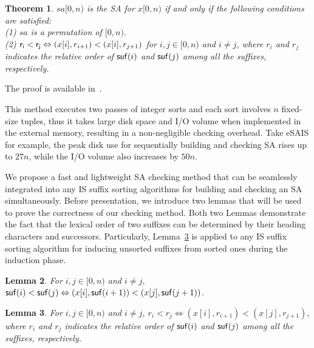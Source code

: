 \documentclass[10pt,journal,compsoc]{IEEEtran}
\newtheorem{theorem}{Theorem}[section]
\newtheorem{lemma}[theorem]{Lemma}
\begin{document}
\begin{theorem} \label{theorem:1}
	$sa[0, n)$ is the SA for $x[0, n)$ if and only if the following conditions are satisfied:\\
	(1) $sa$ is a permutation of $[0, n)$. \\	
	(2) ${\sf r_i < r_j} \Leftrightarrow (x[i], r_{i + 1}) < (x[i], r_{j + 1})$ for $ i, j \in [0, n)$ and $i\ne j$, where $r_i$ and $r_j$ indicates the relative order of ${\sf suf}(i)$ and ${\sf suf}(j)$ among all the suffixes, respectively. \\
\end{theorem}

\begin{IEEEproof}
	The proof is available in~\cite{Dementiev2008a}.
\end{IEEEproof}

This method executes two passes of integer sorts and each sort involves $n$ fixed-size tuples, thus it takes large disk space and I/O volume when implemented in the external memory, resulting in a non-negligible checking overhead. Take eSAIS for example, the peak disk use for sequentially building and checking SA rises up to $27n$, while the I/O volume also increases by $50n$. 


We propose a fast and lightweight SA checking method that can be seamlessly integrated into any IS suffix sorting algorithms for building and checking an SA simultaneously. Before presentation, we introduce two lemmas that will be used to prove the correctness of our checking method. Both two Lemmas demonstrate the fact that the lexical order of two suffixes can be determined by their heading characters and successors. Particularly, Lemma~\ref{lemma:2} is applied to any IS suffix sorting algorithm for inducing unsorted suffixes from sorted ones during the induction phase.

\begin{lemma} \label{lemma:1}
	For $i, j \in [0, n)$ and $i \ne j$, ${\sf suf}(i) < {\sf suf}(j) \Leftrightarrow (x[i], {\sf suf}(i + 1)) < (x[j], {\sf suf}(j + 1))$.
\end{lemma}

\begin{lemma} \label{lemma:2}
	For $i, j \in [0, n)$ and $i \ne j$, $r_i < r_j \Leftrightarrow (x[i], r_{i + 1}) < (x[j], r_{j + 1})$, where $r_i$ and $r_j$ indicates the relative order of ${\sf suf}(i)$ and ${\sf suf}(j)$ among all the suffixes, respectively.
\end{lemma}
\end{document}
